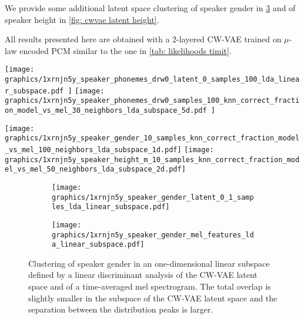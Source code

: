 We provide some additional latent space clustering of speaker gender in \cref{fig: latent space visualization gender} and of speaker height in \cref{fig: cwvae latent height}.

All results presented here are obtained with a 2-layered CW-VAE trained on $\mu$-law encoded PCM similar to the one in \cref{tab: likelihoods timit}.


\begin{figure*}[t!]
    \centering
    \texttt{[image: 
        graphics/1xrnjn5y\_speaker\_phonemes\_drw0\_latent\_0\_samples\_100\_lda\_linear\_subspace.pdf
    ]}
    \hfill
    \texttt{[image: 
        graphics/1xrnjn5y\_speaker\_phonemes\_drw0\_samples\_100\_knn\_correct\_fraction\_model\_vs\_mel\_30\_neighbors\_lda\_subspace\_5d.pdf
    ]}
    \caption{
    (left) Clustering of phonemes in a 2D Linear Discriminant Analysis (LDA) subspace of a CW-VAE latent space ($\vz^{(1)}$).
    (right) Leave-one-out phoneme classification accuracy for a KNN classifier at different $K$ in a 5D LDA subspace of a CW-VAE latent space.
    }
    \label{fig: latent space phoneme and knn}
\end{figure*}


\begin{figure*}[t!]
     \centering
     \texttt{[image: graphics/1xrnjn5y\_speaker\_gender\_10\_samples\_knn\_correct\_fraction\_model\_vs\_mel\_100\_neighbors\_lda\_subspace\_1d.pdf]}
     \hfill
     \texttt{[image: graphics/1xrnjn5y\_speaker\_height\_m\_10\_samples\_knn\_correct\_fraction\_model\_vs\_mel\_50\_neighbors\_lda\_subspace\_2d.pdf]}
    \caption{
    Leave-one-out $k$-nearest-neighbor accuracy with different $k$ for
    (a) the speaker's gender and
    (b) the height of male speakers (female speakers yield a similar result).
    }
    \label{fig: knn fraction latent space height and gender}
\end{figure*}


\begin{figure}[t!]
     \centering
     \hfill
     \begin{subfigure}[b]{0.48\textwidth}
         \centering
         \texttt{[image: graphics/1xrnjn5y\_speaker\_gender\_latent\_0\_1\_samples\_lda\_linear\_subspace.pdf]}
         \caption{}
         \label{fig: latent space gender}
     \end{subfigure}
     \hfill
     \begin{subfigure}[b]{0.48\textwidth}
         \centering
         \texttt{[image: graphics/1xrnjn5y\_speaker\_gender\_mel\_features\_lda\_linear\_subspace.pdf]}
         \caption{}
         \label{fig: mel features gender}
     \end{subfigure}
    \caption{Clustering of speaker gender in an one-dimensional linear subspace defined by a linear discriminant analysis of the CW-VAE latent space and of a time-averaged mel spectrogram. The total overlap is slightly smaller in the subspace of the CW-VAE latent space and the separation between the distribution peaks is larger.}
    \label{fig: latent space visualization gender}
\end{figure}


